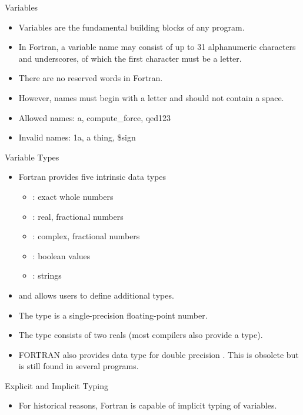 \documentclass[10pt,t]{beamer}
\begin{document}
\begin{frame}[allowframebreaks]{Variables}
  \begin{itemize}
    \item Variables are the fundamental building blocks of any program.
    \item In Fortran, a variable name may consist of up to 31 alphanumeric characters and underscores, of which the first character must be a letter.
    \item There are no reserved words in Fortran.
    \item However, names must begin with a letter and should not contain a space.
    \item Allowed names: a, compute\_force, qed123
    \item Invalid names: 1a, a thing, \$sign
  \end{itemize}
  \begin{eblock}{Variable Types}
    \begin{itemize}
      \item Fortran provides five intrinsic data types
      \begin{itemize}
        \item[] : exact whole numbers
        \item[] : real, fractional numbers
        \item[] : complex, fractional numbers
        \item[] : boolean values
        \item[] : strings
      \end{itemize}
      \item and allows users to define additional types.
      \item The  type is a single-precision floating-point number.
      \item The  type consists of two reals (most compilers also provide a  type).
      \item FORTRAN also provides  data type for double precision . This is obsolete but is still found in several programs.
    \end{itemize}
  \end{eblock}
  \begin{eblock}{Explicit and Implicit Typing}
    \begin{itemize}
      \item For historical reasons, Fortran is capable of implicit typing of variables.

\end{itemize}
\end{eblock}
\end{frame}
\end{document}
